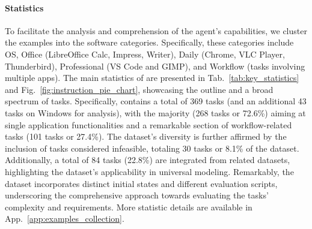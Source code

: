 \paragraph{Statistics}
To facilitate the analysis and comprehension of the agent's capabilities, we cluster the examples into the software categories. 
Specifically, these categories include OS, Office (LibreOffice Calc, Impress, Writer), Daily (Chrome, VLC Player, Thunderbird), Professional (VS Code and GIMP), and Workflow (tasks involving multiple apps).
The main statistics of \ours are presented in Tab.~\ref{tab:key_statistics} and Fig.~\ref{fig:instruction_pie_chart}, showcasing the outline and a broad spectrum of tasks.
Specifically, \ours contains a total of 369 tasks (and an additional 43 tasks on Windows for analysis), with the majority (268 tasks or 72.6\%) aiming at single application functionalities and a remarkable section of workflow-related tasks (101 tasks or 27.4\%). 
The dataset's diversity is further affirmed by the inclusion of tasks considered infeasible, totaling 30 tasks or 8.1\% of the dataset.
Additionally, a total of 84 tasks (22.8\%) are integrated from related datasets, highlighting the dataset's applicability in universal modeling.
Remarkably, the dataset incorporates \numinitstates distinct initial states and \numevals different 
evaluation scripts, underscoring the comprehensive approach towards evaluating the tasks' complexity and requirements.
More statistic details are available in App.~\ref{app:examples_collection}.


